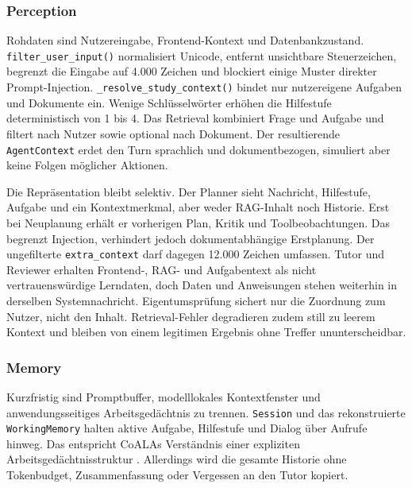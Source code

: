 \subsubsection{Perception}

Rohdaten sind Nutzereingabe, Frontend-Kontext und Datenbankzustand.
\texttt{filter\_user\_input()} normalisiert Unicode, entfernt unsichtbare
Steuerzeichen, begrenzt die Eingabe auf 4.000 Zeichen und blockiert einige
Muster direkter Prompt-Injection. \texttt{\_resolve\_study\_context()} bindet
nur nutzereigene Aufgaben und Dokumente ein. Wenige Schlüsselwörter erhöhen die
Hilfestufe deterministisch von 1 bis 4. Das Retrieval kombiniert Frage und
Aufgabe und filtert nach Nutzer sowie optional nach Dokument. Der resultierende
\texttt{AgentContext} erdet den Turn sprachlich und dokumentbezogen, simuliert
aber keine Folgen möglicher Aktionen.

Die Repräsentation bleibt selektiv. Der Planner sieht Nachricht, Hilfestufe,
Aufgabe und ein Kontextmerkmal, aber weder RAG-Inhalt noch Historie. Erst bei
Neuplanung erhält er vorherigen Plan, Kritik und Toolbeobachtungen. Das begrenzt
Injection, verhindert jedoch dokumentabhängige Erstplanung. Der ungefilterte
\texttt{extra\_context} darf dagegen 12.000 Zeichen umfassen. Tutor und Reviewer
erhalten Frontend-, RAG- und Aufgabentext als nicht vertrauenswürdige Lerndaten,
doch Daten und Anweisungen stehen weiterhin in derselben Systemnachricht.
Eigentumsprüfung sichert nur die Zuordnung zum Nutzer, nicht den Inhalt.
Retrieval-Fehler degradieren zudem still zu leerem Kontext und bleiben von einem
legitimen Ergebnis ohne Treffer ununterscheidbar.

\subsubsection{Memory}

Kurzfristig sind Promptbuffer, modelllokales Kontextfenster und
anwendungsseitiges Arbeitsgedächtnis zu trennen. \texttt{Session} und das
rekonstruierte \texttt{WorkingMemory} halten aktive Aufgabe, Hilfestufe und
Dialog über Aufrufe hinweg. Das entspricht CoALAs Verständnis einer expliziten
Arbeitsgedächtnisstruktur \parencite{sumersEtAl2024}. Allerdings wird die gesamte
Historie ohne Tokenbudget, Zusammenfassung oder Vergessen an den Tutor kopiert.

